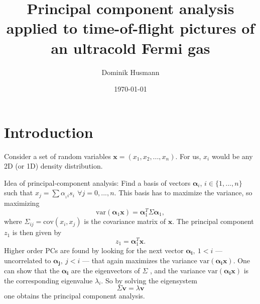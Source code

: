 \documentclass[
oneside,titlepage,numbers=noenddot,headinclude,%
footinclude=true,cleardoublepage=empty,
BCOR=5mm,paper=a4,fontsize=11pt, %
american %
]{scrartcl}
\begin{document}

\title{Principal component analysis applied to time-of-flight pictures of an ultracold Fermi gas}
\author{Dominik Husmann}
\date{\today}   
\newpage

\maketitle

\section{Introduction}
Consider a set of random variables \( \bm{x} =(x_1,x_2,...,x_n)\). For us, \( x_i \) would be any 2D (or 1D) density distribution.

Idea of principal-component analysis: Find a basis of vectors \( \bm{\alpha}_i \), $i\in\{1,...,n\}$ such that \( x_j =\sum \alpha_{_1i} s_i\,\ \forall j=0,...,n \). This basis has to maximize the variance, so maximizing
\begin{equation}
	\mathrm{var}(\bm{\alpha}_1\bm{x}) = \bm{\alpha}_1^T\Sigma\bm{\alpha}_1 ,
\end{equation} 
where \( \Sigma_{ij}=\mathrm{cov}(x_i,x_j) \) is the covariance matrix of \( \bm{x} \). The principal component \( z_1 \) is then given by 
\[ z_1 = \bm{\alpha}^T_1\bm{x}.
\]
Higher order PCs are found by looking for the next vector $\bm{\alpha_{i}},\ 1<i$ --- uncorrelated to $\bm{\alpha_j},\ j<i$ --- that again maximizes the variance \( \mathrm{var}(\bm{\alpha_i}\bm{x}) \).
One can show that the $\bm{\alpha_i}$ are the eigenvectors of $\Sigma$ \cite{jolliffe_principal_2002}, and the variance $\mathrm{var}(\bm{\alpha_{i}}\bm{x})$ is the corresponding eigenvalue $\lambda_i$. So by solving the eigensystem
\begin{equation}
	\Sigma \bm{v}= \lambda \bm{v}
\end{equation}
one obtains the principal component analysis.
\end{document}
